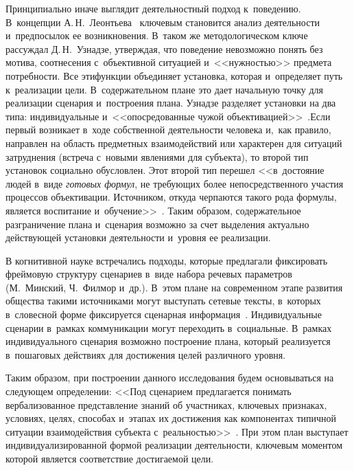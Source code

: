 \begin{multicols}{2}
  Принципиально иначе выглядит деятельностный подход к~поведению. 
В~концепции А.\,Н.~Ле\-онть\-ева~\cite{6-sm} ключевым становится анализ 
деятельности и~предпосылок ее возникновения. В~таком же методологическом 
ключе рассуждал Д.\,Н.~Узнадзе, утверждая, что поведение невозможно понять 
без мотива, соотнесения с~объективной ситуацией и~<<нуж\-ностью>> предмета 
потребности. Все эти\linebreak функции объединяет установка, которая и~определяет 
путь к~реализации цели. В~содержательном плане это дает начальную точку 
для реализации сценария и~построения плана. Узнадзе \mbox{разделяет} 
установки на два типа: индивидуальные и~<<опосредованные чужой 
объективацией>>~\cite[с.~47]{7-sm}.\linebreak Если первый возникает в~ходе 
собственной дея\-тель\-ности человека и,~как правило, на\-прав\-лен на об\-ласть 
предметных взаимодействий или характерен для ситуаций затруднения 
(встреча с~новыми явлениями для субъекта), то второй тип установок 
социально обуслов\-лен. Этот второй тип перешел <<в~достояние людей в~виде 
\textit{готовых \mbox{формул}}, не тре\-бу\-ющих более непосредственного учас\-тия 
процессов объективации. Источником, откуда черпаются такого рода формулы, 
является воспитание и~обуче\-ние>>~\cite[с.~203]{8-sm}. Таким образом, 
содержательное разграничение плана и~сценария воз\-мож\-но за счет выделения 
актуально дей\-ст\-ву\-ющей уста\-нов\-ки де\-я\-тель\-ности и~уров\-ня ее реа\-ли\-за\-ции.
{

}
  
  В когнитивной науке встречались подходы, которые предлагали фиксировать 
фреймовую структуру сценариев в~виде набора речевых параметров 
(М.~Минский, Ч.~Филмор и~др.). В~этом плане на современном этапе развития 
общества такими источниками могут выступать сетевые тексты, в~которых 
в~словесной форме фиксируется сценарная информация~\cite{9-sm}. 
Индивидуальные сценарии в~рамках коммуникации могут переходить 
в~социальные. В~рамках индивидуального сценария возможно построение 
плана, который реализуется в~пошаговых действиях для достижения целей 
различного \mbox{уровня}. 
  
  Таким образом, при построении данного исследования будем основываться 
на следующем определении: <<Под сценарием предлагается понимать 
вербализованное представление знаний об участниках, ключевых признаках, 
условиях, целях, способах и~этапах их достижения как компонентах типичной 
ситуации взаимодействия субъекта с~реальностью>>~\cite[с.~219]{9-sm}. При 
этом план выступает индивидуализированной формой реализации 
деятельности, ключевым моментом которой является соответствие достигаемой 
цели.
  

\end{multicols}
